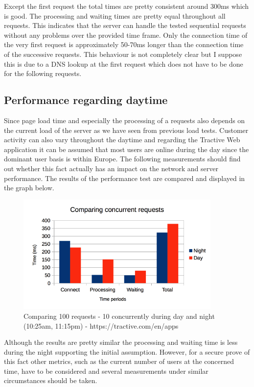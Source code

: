 Except the first request the total times are pretty consistent around 300ms which is good. The processing and waiting times are pretty equal throughout all requests. This indicates that the server can handle the tested sequential requests without any problems over the provided time frame. Only the connection time of the very first request is approximately 50-70ms longer than the connection time of the successive requests. This behaviour is not completely clear but I suppose this is due to a DNS lookup at the first request which does not have to be done for the following requests.  

\subsection{Performance regarding daytime}
Since page load time and especially the processing of a requests also depends on the current load of the server as we have seen from previous load tests. Customer activity can also vary throughout the daytime and regarding the Tractive Web application it can be assumed that most users are online during the day since the dominant user basis is within Europe. The following measurements should find out whether this fact actually has an impact on the network and server performance. The results of the performance test are compared and displayed in the graph below.

\begin{figure}[h!]
	\centering
		\includegraphics[width=0.9\textwidth]{imgs/day_night_con.png}
	\caption{Comparing 100 requests - 10 concurrently during day and night (10:25am, 11:15pm) - https://tractive.com/en/apps}
\end{figure}

Although the results are pretty similar the processing and waiting time is less during the night supporting the initial assumption. However, for a secure prove of this fact other metrics, such as the current number of users at the concerned time, have to be considered and several measurements under similar circumstances should be taken.

